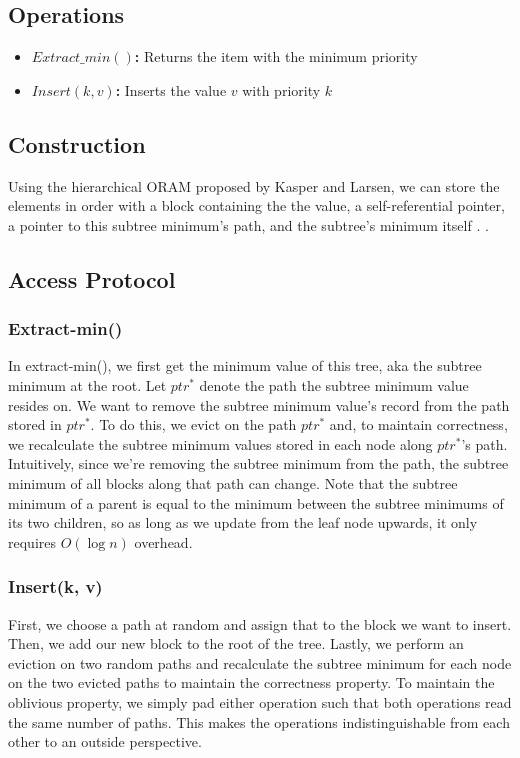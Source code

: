 \documentclass[11pt]{article}
\begin{document}
\subsection{Operations}
\begin{itemize}
    \item \textbf{$Extract\_min()$:} Returns the item with the minimum priority
    \item \textbf{$Insert(k, v)$:} Inserts the value $v$ with priority $k$
\end{itemize}

\subsection{Construction}
Using the hierarchical ORAM proposed by Kasper and Larsen, we can store the elements in order with a block containing the the value, a self-referential pointer, a pointer to this subtree minimum's path, and the subtree's minimum itself \cite{larsen2018yes} \cite{asharov2023futorama}. \cite{wang2014oblivious}.

\subsection{Access Protocol}

\subsubsection{Extract-min()}
In extract-min(), we first get the minimum value of this tree, aka the subtree minimum at the root. Let $ptr^*$ denote the path the subtree minimum value resides on. We want to remove the subtree minimum value's record from the path stored in $ptr^*$. To do this, we evict on the path $ptr^*$ and, to maintain correctness, we recalculate the subtree minimum values stored in each node along $ptr^*$'s path. Intuitively, since we're removing the subtree minimum from the path, the subtree minimum of all blocks along that path can change. Note that the subtree minimum of a parent is equal to the minimum between the subtree minimums of its two children, so as long as we update from the leaf node upwards, it only requires $O(\log n)$ overhead.


\subsubsection{Insert(k, v)}
First, we choose a path at random and assign that to the block we want to insert. Then, we add our new block to the root of the tree. Lastly, we perform an eviction on two random paths and recalculate the subtree minimum for each node on the two evicted paths to maintain the correctness property. To maintain the oblivious property, we simply pad either operation such that both operations read the same number of paths. This makes the operations indistinguishable from each other to an outside perspective.
\end{document}
